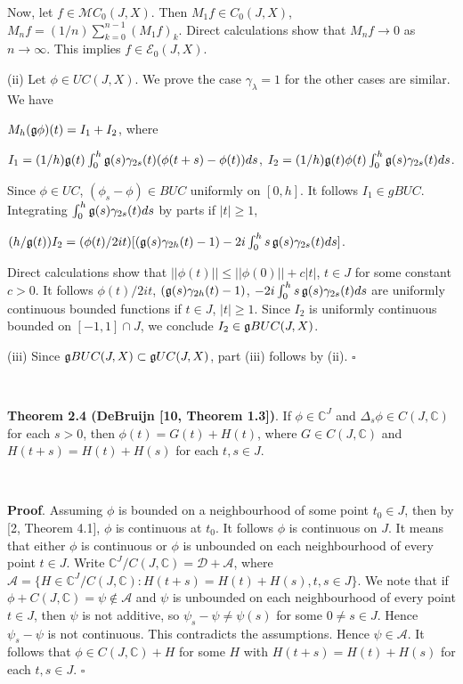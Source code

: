 \documentclass[10pt,onside,reqno]{amsart}
\newcommand{\Cdb}{\mbox{$\mathbb{C}$}}
\newcommand{\E}{\mbox{${\mathcal E}$}}
\newcommand{\M}{\mbox{${\mathcal M}$}}
\theoremstyle{remark}
\theoremstyle{definition}
\begin{document}
Now, let $f\in \M C_0 (J,X)$.  Then $M_1  f\in C_0 (J,X)$,
$M_n f= (1/n) \sum_{k=0}^{n-1} (M_1 f)_{k}$. Direct calculations show that $M_n f\to 0$ as $n\to \infty$. This implies $f\in \E_0 (J,X)$.



(ii) Let $\phi \in UC (J,X)$. We prove the case $\gamma_{\lambda}=1$ for the other cases are similar.   We have

 $M_h (\frak{g}\phi) (t)= I_1 +I_2$, where

$ I_1= (1/h) \frak{g}(t) \int_0^h \frak{g}(s)\gamma_{2s} (t)(\phi (t+s)-\phi (t)) ds $, $I_2 =(1/h) \frak{g}(t) \phi(t) \int_0^h \frak{g}(s)\gamma_{2s} (t) ds$.

\noindent   Since $\phi \in UC$,   $(\phi_s-\phi) \in BUC$ uniformly on $[0,h]$. It follows  $I_1 \in g  BUC$.
 Integrating  $\int_0^h \frak{g}(s)\gamma_{2s} (t) ds$ by parts if  $|t| \ge 1$,

       $(h/\frak{g}(t))  I_2 =
        (\phi(t)/{2it})[( \frak{g}(s)\gamma_{2h}(t) -1)-2i \int_0^h s \, \frak{g}(s)\gamma_{2s} (t) ds]$.

\noindent Direct calculations show that $||\phi (t)|| \le ||\phi(0)||+ c |t| $, $t\in J$  for some constant $c > 0$. It follows $\phi(t)/{2it}$,  $(\frak{g}(s)\gamma_{2h}(t) -1)$, $ -2i \int_0^h s \, \frak{g}(s)\gamma_{2s} (t) ds$ are uniformly continuous bounded functions if  $t\in  J$, $|t| \ge 1$. Since  $I_2$ is uniformly continuous bounded on $[-1,1]\cap J$, we conclude $I_2 \in \frak{g} BUC(J,X)$.

(iii) Since  $\frak{g} BUC(J,X) \subset \frak{g} UC(J,X)$, part (iii) follows by (ii).
$\square$


\

\noindent\textbf{Theorem 2.4 (DeBruijn [10, Theorem  1.3])}. If $ \phi \in \Cdb^J$ and $\Delta_s \phi\in C(J,\Cdb)$ for each $s > 0$, then $\phi (t) = G(t)+ H(t)$, where $G\in C(J,\Cdb)$ and $H (t+s)=H(t) +H(s)$ for each $t, s \in J$.

\

\noindent\textbf{Proof}.
Assuming $\phi$ is bounded  on a neighbourhood of some point $t_0\in J$, then by [2, Theorem 4.1], $\phi$ is continuous at $t_0$. It follows $\phi$ is continuous on $J$. It means that either $\phi$ is continuous or $\phi$ is unbounded on each neighbourhood of every point $t\in J$. Write $\Cdb^J/C(J,\Cdb)= \mathcal {D}+ \mathcal {A}$, where $\mathcal {A}=\{H\in \Cdb^J/C(J,\Cdb): H (t+s)=H(t)+H(s),  t,s \in J\}$. We note that if $\phi+ C(J,\Cdb)=\psi\not\in \mathcal {A}$ and $\psi$ is unbounded on each neighbourhood of every point $t\in J$, then $\psi$ is not additive, so $ \psi_s -\psi \not =  \psi (s)$ for some $0\not = s\in J$. Hence $\psi_s -\psi $ is not continuous. This contradicts the assumptions. Hence $\psi\in \mathcal {A}$. It follows that $\phi\in C(J,\Cdb)+ H$ for some $H$ with $H(t+s)=H(t)+ H(s)$ for each $t, s \in J$.
$\square$
\end{document}
